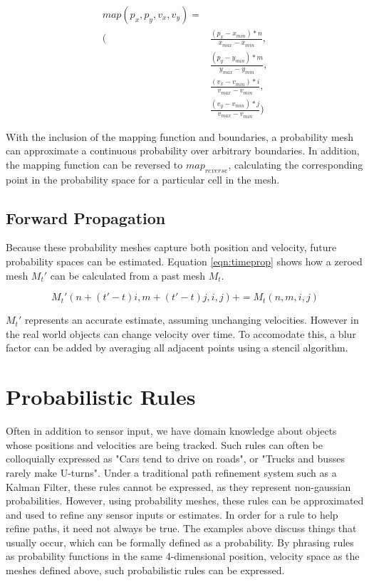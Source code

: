 \begin{equation} \label{eqn:normalize}
    \begin{aligned}
        map(p_x, p_y, v_x, v_y) = &\\
        (&\frac{(p_x - x_{min})*n}{x_{max}-x_{min}},\\
        &\frac{(p_y - y_{min})*m}{y_{max}-y_{min}}, \\
        &\frac{(v_x - v_{min})*i}{v_{max}-v_{min}},\\
        &\frac{(v_y - v_{min})*j}{v_{max}-v_{min}})
    \end{aligned}
\end{equation}

With the inclusion of the mapping function and boundaries, a probability mesh can approximate a continuous probability over arbitrary boundaries. In addition, the mapping function can be reversed to $map_{reverse}$, calculating the corresponding point in the probability space for a particular cell in the mesh.

\subsection{Forward Propagation}

Because these probability meshes capture both position and velocity, future probability spaces can be estimated. Equation \ref{eqn:timeprop} shows how a zeroed mesh $M_t'$ can be calculated from a past mesh $M_t$.

\begin{equation} \label{eqn:timeprop}
    M_t'(n+(t'-t)i,m+(t'-t)j,i,j) += M_t(n,m,i,j)
\end{equation}

$M_t'$ represents an accurate estimate, assuming unchanging velocities. However in the real world objects can change velocity over time. To accomodate this, a blur factor can be added by averaging all adjacent points using a stencil algorithm.

\section{Probabilistic Rules}

Often in addition to sensor input, we have domain knowledge about objects whose positions and velocities are being tracked. Such rules can often be colloquially expressed as "Cars tend to drive on roads", or "Trucks and busses rarely make U-turns". Under a traditional path refinement system such as a Kalman Filter, these rules cannot be expressed, as they represent non-gaussian probabilities. However, using probability meshes, these rules can be approximated and used to refine any sensor inputs or estimates. In order for a rule to help refine paths, it need not always be true. The examples above discuss things that usually occur, which can be formally defined as a probability. By phrasing rules as probability functions in the same 4-dimensional position, velocity space as the meshes defined above, such probabilistic rules can be expressed.

